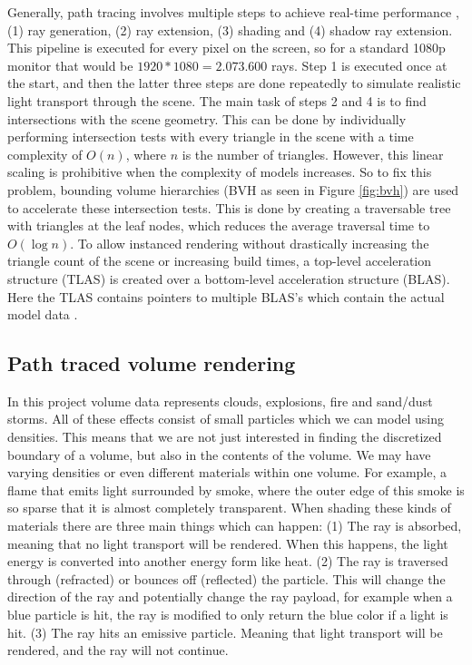 Generally, path tracing involves multiple steps to achieve real-time performance \cite{laine2013megakernels}, (1) ray generation, (2) ray extension, (3) shading and (4) shadow ray extension. This pipeline is executed for every pixel on the screen, so for a standard 1080p monitor that would be $1920*1080=2.073.600$ rays. Step 1 is executed once at the start, and then the latter three steps are done repeatedly to simulate realistic light transport through the scene. The main task of steps 2 and 4 is to find intersections with the scene geometry. This can be done by individually performing intersection tests with every triangle in the scene with a time complexity of $O(n)$, where $n$ is the number of triangles. However, this linear scaling is prohibitive when the complexity of models increases. So to fix this problem, bounding volume hierarchies (BVH as seen in Figure \ref{fig:bvh}) are used to accelerate these intersection tests. This is done by creating a traversable tree with triangles at the leaf nodes, which reduces the average traversal time to  $O(\log n)$. To allow instanced rendering without drastically increasing the triangle count of the scene or increasing build times, a top-level acceleration structure (TLAS) is created over a bottom-level acceleration structure (BLAS). Here the TLAS contains pointers to multiple BLAS's which contain the actual model data \cite{VulkanAccelerationStructures}.

\subsection{Path traced volume rendering} \label{related_work:path_traced_volume_rendering}
In this project volume data represents clouds, explosions, fire and sand/dust storms. All of these effects consist of small particles which we can model using densities. This means that we are not just interested in finding the discretized boundary of a volume, but also in the contents of the volume. We may have varying densities or even different materials within one volume. For example, a flame that emits light surrounded by smoke, where the outer edge of this smoke is so sparse that it is almost completely transparent. When shading these kinds of materials there are three main things which can happen: (1) The ray is absorbed, meaning that no light transport will be rendered. When this happens, the light energy is converted into another energy form like heat. (2) The ray is traversed through (refracted) or bounces off (reflected) the particle. This will change the direction of the ray and potentially change the ray payload, for example when a blue particle is hit, the ray is modified to only return the blue color if a light is hit. (3) The ray hits an emissive particle. Meaning that light transport will be rendered, and the ray will not continue.

